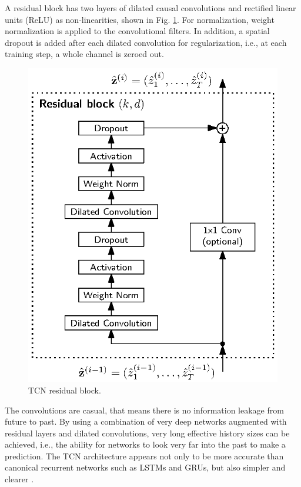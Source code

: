 \documentclass{scrartcl}
\begin{document}
A residual block has two layers of dilated causal convolutions and rectified linear units (ReLU) as non-linearities, shown in Fig. \ref{fig:residual_block}. For normalization, weight normalization \cite{Salimans2016} is applied to the convolutional filters. In addition, a spatial dropout \cite{Srivastava2014} is added after each dilated convolution for regularization, i.e., at each training step, a whole channel is zeroed out.
\begin{figure}[htbp]
\centering
\includegraphics[scale=1]{figures/residual_block.eps}
\caption{TCN residual block.}
\label{fig:residual_block} 
\end{figure}
The convolutions are casual, that means there is no information leakage from future to past. By using a combination of very deep networks augmented with residual layers and dilated convolutions, very long effective history sizes can be achieved, i.e., the ability for networks to look very far into the past to make a prediction. The TCN architecture appears not only to be more accurate than canonical recurrent networks such as LSTMs and GRUs, but also simpler and clearer \cite{Bai2018}.
\end{document}
